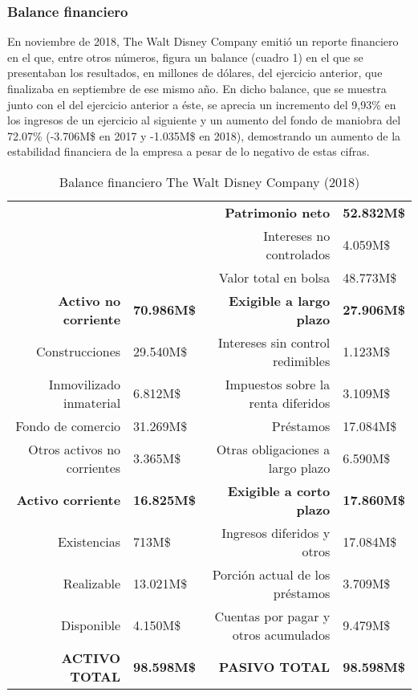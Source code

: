\subsubsection{Balance financiero}

En noviembre de 2018, The Walt Disney Company emitió un reporte financiero en el que, entre otros números, figura un balance (cuadro 1) en el que se presentaban los resultados, en millones de dólares, del ejercicio anterior, que finalizaba en septiembre de ese mismo año. En dicho balance, que se muestra junto con el del ejercicio anterior a éste, se aprecia un incremento del 9,93\% en los ingresos de un ejercicio al siguiente y un aumento del fondo de maniobra del 72.07\% (-3.706M\$ en 2017 y -1.035M\$ en 2018), demostrando un aumento de la estabilidad financiera de la empresa a pesar de lo negativo de estas cifras.

\begin{table}[]
\centering
\begin{tabular}{rlrl}
 & & \textbf{Patrimonio neto} & \textbf{52.832M\$} \\
 & & Intereses no controlados & 4.059M\$ \\
 & & Valor total en bolsa & 48.773M\$ \\
\textbf{Activo no corriente} & \textbf{70.986M\$}& \textbf{Exigible a largo plazo} & \textbf{27.906M\$} \\
Construcciones & 29.540M\$ & Intereses sin control redimibles & 1.123M\$ \\
Inmovilizado inmaterial & 6.812M\$ & Impuestos sobre la renta diferidos & 3.109M\$ \\
Fondo de comercio & 31.269M\$ & Préstamos & 17.084M\$ \\
Otros activos no corrientes & 3.365M\$ & Otras obligaciones a largo plazo & 6.590M\$ \\
\textbf{Activo corriente} & \textbf{16.825M\$} & \textbf{Exigible a corto plazo} & \textbf{17.860M\$} \\
Existencias & 713M\$ & Ingresos diferidos y otros & 17.084M\$ \\
Realizable & 13.021M\$ & Porción actual de los préstamos & 3.709M\$ \\
Disponible & 4.150M\$ & Cuentas por pagar y otros acumulados & 9.479M\$ \\
\textbf{ACTIVO TOTAL} & \textbf{98.598M\$} & \textbf{PASIVO TOTAL} & \textbf{98.598M\$}
\end{tabular}
\caption{\label{fig:frog}Balance financiero The Walt Disney Company (2018)}
\end{table}